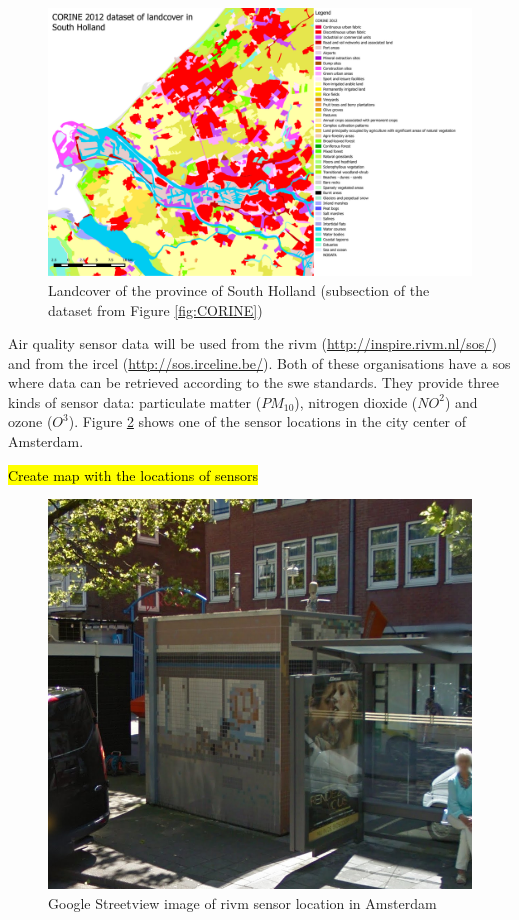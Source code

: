 \begin{figure}
	\centering
	\includegraphics[width=1\linewidth]{figs/CORINE_NL_BE_color_zoom.PDF}
	\caption{Landcover of the province of South Holland (subsection of the dataset from Figure \ref{fig:CORINE})}
	\label{fig:CORINEZOOM}
\end{figure}

Air quality sensor data will be used from the \ac{rivm} (\url{http://inspire.rivm.nl/sos/}) and from the \ac{ircel} (\url{http://sos.irceline.be/}). Both of these organisations have a \ac{sos} where data can be retrieved according to the \ac{swe} standards. They provide three kinds of sensor data: particulate matter ($PM_{10}$), nitrogen dioxide ($NO^{2}$) and ozone ($O^{3}$). Figure \ref{fig:Sensor} shows one of the sensor locations in the city center of Amsterdam. 

\hl{Create map with the locations of sensors}

\begin{figure}
	\centering
	\includegraphics[width=1\linewidth]{figs/SensorAdam.png}
	\caption{Google Streetview image of \ac{rivm} sensor location in Amsterdam}
	\label{fig:Sensor}
\end{figure}


